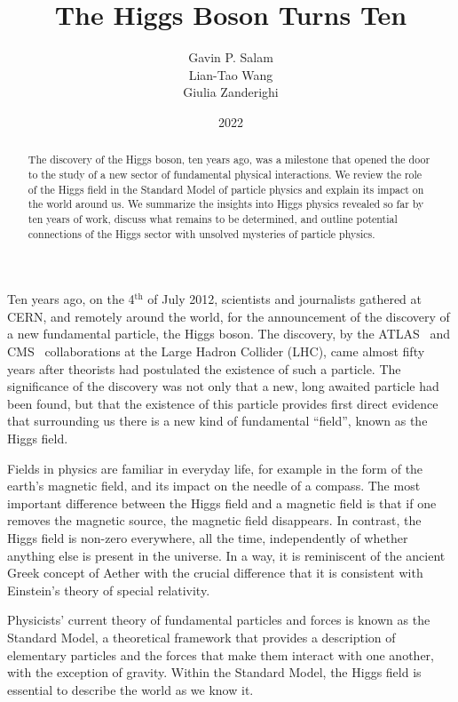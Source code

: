 \documentclass[12pt]{article}
\title{The Higgs Boson Turns Ten}
\author{Gavin P. Salam \\ Lian-Tao Wang \\ Giulia Zanderighi}
\date{2022}
\begin{document}
\maketitle

\begin{abstract}
  The discovery of the Higgs boson, ten years ago, was a milestone
  that opened the door to the study of a new sector of fundamental
  physical interactions.
  We review the role of the Higgs field in the Standard Model of
  particle physics and explain its impact on the world around us.
  We summarize the insights into Higgs physics revealed so far by ten years of work, discuss what remains
  to be determined, and
  outline potential connections of the Higgs sector with unsolved
  mysteries of particle physics.
\end{abstract}
\bigskip

Ten years ago, on the 4$^\text{th}$ of July 2012, scientists and journalists
gathered at CERN, and remotely around the world, for the announcement
of the discovery of a new fundamental particle, the Higgs boson.
%
The discovery, by the ATLAS~\cite{ATLAS:2012yve} and
CMS~\cite{CMS:2012qbp} collaborations at the Large Hadron Collider
(LHC), came almost fifty years after theorists had postulated the existence
of such a particle.
%
The significance of the discovery was not only that a new, long
awaited particle had been found, but that the existence of this
particle provides first direct evidence that surrounding us there is a
new kind of fundamental ``field'', known as the Higgs field.

Fields in physics are familiar in everyday life, for example 
in the form of the earth's magnetic field, and its
impact on the needle of a compass.
% 
The most important difference between the Higgs field and a magnetic field is that  if one removes the magnetic source,
the magnetic field disappears.
%
In contrast, the Higgs field is non-zero everywhere, all the time, independently of whether
anything else is present in the universe.
%
In a way, it is reminiscent of the ancient Greek concept of Aether
with the crucial difference that it is consistent with
Einstein's theory of special relativity.

Physicists' current theory of fundamental particles and forces is
known as the Standard Model, a theoretical framework that provides a
description of elementary particles and the forces that make them
interact with one another, with the exception of gravity. Within the
Standard Model, the Higgs field is essential to describe the world as
we know it.
%
\end{document}
